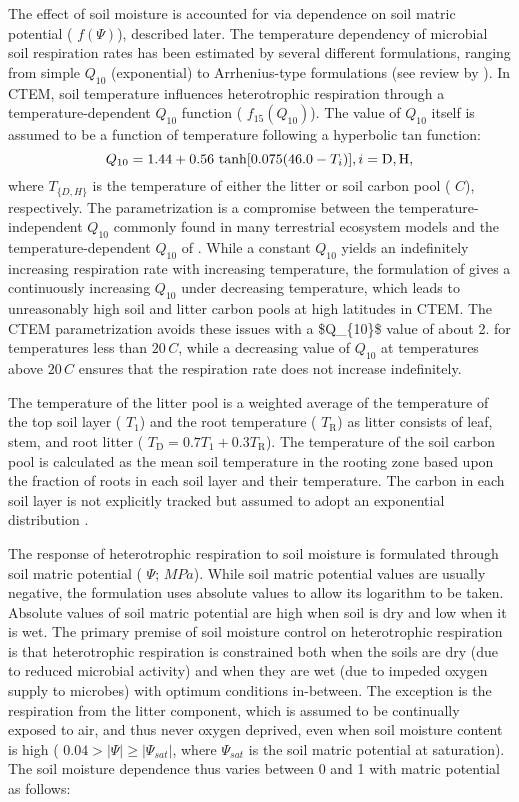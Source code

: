 The effect of soil moisture is accounted for via dependence on soil matric potential ( $f(\Psi)$), described later. The temperature dependency of microbial soil respiration rates has been estimated by several different formulations, ranging from simple $Q_{10}$ (exponential) to Arrhenius-\/type formulations (see review by \cite{Lloyd1994-ct}). In C\+T\+E\+M, soil temperature influences heterotrophic respiration through a temperature-\/dependent $Q_{10}$ function ( $f_{15}(Q_{10})$). The value of $Q_{10}$ itself is assumed to be a function of temperature following a hyperbolic tan function\+: \[ Q_{10} = 1.44 + 0.56\,\tanh[0.075 (46.0 - T_i)], \nonumber\\ i = \mathrm{D}, \mathrm{H}\label{hyper}, \] where $T_{\{D,H\}}$ is the temperature of either the litter or soil carbon pool ( $C$), respectively. The parametrization is a compromise between the temperature-\/independent $Q_{10}$ commonly found in many terrestrial ecosystem models \cite{Cox2001-am} and the temperature-\/dependent $Q_{10}$ of \cite{Kirschbaum1995-db}. While a constant $Q_{10}$ yields an indefinitely increasing respiration rate with increasing temperature, the formulation of \cite{Kirschbaum1995-db} gives a continuously increasing $Q_{10}$ under decreasing temperature, which leads to unreasonably high soil and litter carbon pools at high latitudes in C\+T\+E\+M. The C\+T\+E\+M parametrization avoids these issues with a \$\+Q\+\_\+\{10\}\$ value of about 2. for temperatures less than $20\,C$, while a decreasing value of $Q_{10}$ at temperatures above $20\,C$ ensures that the respiration rate does not increase indefinitely.

The temperature of the litter pool is a weighted average of the temperature of the top soil layer ( $T_1$) and the root temperature ( $T_\mathrm{R}$) as litter consists of leaf, stem, and root litter ( $T_\mathrm{D} = 0.7 T_1 + 0.3T_\mathrm{R}$). The temperature of the soil carbon pool is calculated as the mean soil temperature in the rooting zone based upon the fraction of roots in each soil layer and their temperature. The carbon in each soil layer is not explicitly tracked but assumed to adopt an exponential distribution \cite{Jobbagy2000-pa}.

The response of heterotrophic respiration to soil moisture is formulated through soil matric potential ( $\Psi$; $MPa$). While soil matric potential values are usually negative, the formulation uses absolute values to allow its logarithm to be taken. Absolute values of soil matric potential are high when soil is dry and low when it is wet. The primary premise of soil moisture control on heterotrophic respiration is that heterotrophic respiration is constrained both when the soils are dry (due to reduced microbial activity) and when they are wet (due to impeded oxygen supply to microbes) with optimum conditions in-\/between. The exception is the respiration from the litter component, which is assumed to be continually exposed to air, and thus never oxygen deprived, even when soil moisture content is high ( $0.04 > \vert \Psi \vert \geq \vert \Psi_{sat} \vert$, where $\Psi_{sat}$ is the soil matric potential at saturation). The soil moisture dependence thus varies between 0 and 1 with matric potential as follows\+:

